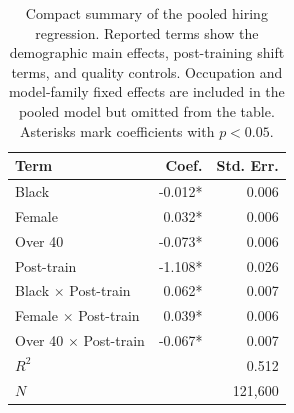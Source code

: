 \begin{table}[p]
\centering
\scriptsize
\setlength{\tabcolsep}{5pt}
\renewcommand{\arraystretch}{1.12}
\begin{tabular}{lrr}
\toprule
Term & Coef. & Std. Err. \\
\midrule
Black & -0.012* & 0.006 \\
Female & 0.032* & 0.006 \\
Over 40 & -0.073* & 0.006 \\
Post-train & -1.108* & 0.026 \\
Black $\times$ Post-train & 0.062* & 0.007 \\
Female $\times$ Post-train & 0.039* & 0.006 \\
Over 40 $\times$ Post-train & -0.067* & 0.007 \\
\midrule
$R^2$ & \multicolumn{2}{r}{0.512} \\
$N$ & \multicolumn{2}{r}{121,600} \\
\hline
\end{tabular}
\caption{Compact summary of the pooled hiring regression. Reported terms show the demographic main effects, post-training shift terms, and quality controls. Occupation and model-family fixed effects are included in the pooled model but omitted from the table. Asterisks mark coefficients with $p < 0.05$.}
\label{tab:appendix-pooled-regression-summary}
\end{table}
